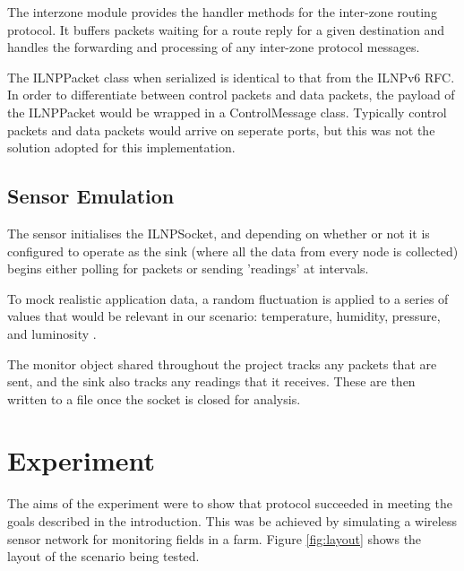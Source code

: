 \documentclass[12pt]{article}
\begin{document}
The interzone module provides the handler methods for the inter-zone routing protocol. It buffers packets waiting for a route reply for a given destination and handles the forwarding and processing of any inter-zone protocol messages.

The ILNPPacket class when serialized is identical to that from the ILNPv6 RFC. In order to differentiate between control packets and data packets, the payload of the ILNPPacket would be wrapped in a ControlMessage class. Typically control packets and data packets would arrive on seperate ports, but this was not the solution adopted for this implementation.

\subsection{Sensor Emulation}

The sensor initialises the ILNPSocket, and depending on whether or not it is configured to operate as the sink (where all the data from every node is collected) begins either polling for packets or sending 'readings' at intervals.

To mock realistic application data, a random fluctuation is applied to a series of values that would be relevant in our scenario: temperature, humidity, pressure, and luminosity \cite{agrisensor}.

The monitor object shared throughout the project tracks any packets that are sent, and the sink also tracks any readings that it receives. These are then written to a file once the socket is closed for analysis.

\pagebreak
\section{Experiment}

The aims of the experiment were to show that protocol succeeded in meeting the goals described in the introduction. This was be achieved by simulating a wireless sensor network for monitoring fields in a farm. Figure \ref{fig:layout} shows the layout of the scenario being tested. 
\end{document}
